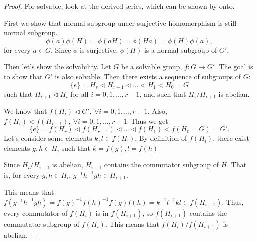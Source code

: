 \documentclass[12pt,a4paper,english]{article}
\theoremstyle{plain}
\theoremstyle{definition}
\begin{document}
\begin{proof}
For solvable, look at the derived series, which can be shown by onto. 

First we show that normal subgroup under surjective homomorphism is still normal subgroup.
\begin{equation*}
    \phi(a)\phi(H)=\phi(aH)=\phi(Ha)=\phi(H)\phi(a), 
\end{equation*}
for every $a\in G$. Since $\phi$ is surjective, $\phi(H)$ is a normal subgroup of $G'$. 

Then let's show the solvability.
Let $G$ be a solvable group, $f:G\rightarrow G'$. The goal is to show that $G'$ is also solvable.
Then there exists a sequence of subgroups of $G$:
\begin{equation*}
    \{e\}=H_{r}\triangleleft H_{r-1}\triangleleft...\triangleleft H_{1}\triangleleft H_{0}=G
\end{equation*}
 such that $H_{i+1}\triangleleft H_{i}$ for all $i=0,1,...,r-1$, and such that $H_{i}/H_{i+1}$ is abelian.
 
 We know that $f(H_{i})\triangleleft G',\ \forall i=0,1,...,r-1$. Also, $f(H_{i})\triangleleft f(H_{i-1}),\ \forall i=0,1,...,r-1$. Thus we get 
 \begin{equation*}
     \{e\}=f(H_{r})\triangleleft f(H_{r-1})\triangleleft...\triangleleft f(H_{1})\triangleleft f(H_{0}=G)=G'.
 \end{equation*}
 Let's consider some elements $k, l \in f(H_i)$. By definition of $f(H_i)$, there exist elements $g,h \in H_i$ such that $k=f(g), l=f(h)$

Since $H_i/H_{i+1}$ is abelian, $H_{i+1}$ contains the commutator subgroup of $H$. That is, for every $g, h \in H_i$, $g^{-1}h^{-1}gh \in H_{i+1}$.

This means that $f(g^{-1}h^{-1}gh)=f(g)^{-1}f(h)^{-1}f(g)f(h)=k^{-1}l^{-1}kl \in f(H_{i+1})$. Thus, every commutator of $f(H_i)$ is in $f(H_{i+1})$, so $f(H_{i+1})$ contains the commutator subgroup of $f(H_i)$. This means that $f(H_i)/f(H_{i+1})$ is abelian.
\end{proof}
\end{document}
